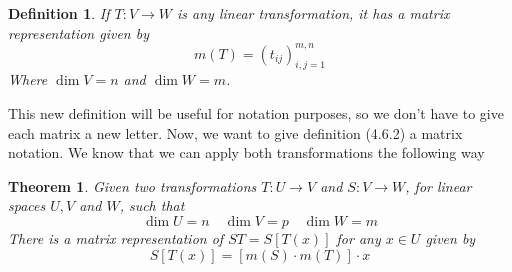 \documentclass{book}
\newtheorem{theorem}{Theorem}[section]
\newtheorem{definition}{Definition}[section]
\begin{document}
\begin{definition}
    If $T: V \to W$ is any linear transformation, it has a matrix representation given by
    \begin{equation}
        m(T) = \left(t_{ij}\right)^{m,n}_{i,j=1}
    \end{equation}
    Where $\dim V = n$ and $\dim W = m$.
\end{definition}
This new definition will be useful for notation purposes, so we don't have to give each matrix a new letter.
Now, we want to give definition (4.6.2) a matrix notation. We know that we can apply both transformations the following way
\begin{theorem}
    Given two transformations $T: U \to V$ and $S: V \to W$, for linear spaces $U,V$ and $W$, such that
    \begin{equation*}
        \dim U = n\quad\dim V = p\quad\dim W = m
    \end{equation*}
    There is a matrix representation of $ST = S\left[T(x)\right]$ for any $x\in U$ given by
    \begin{equation*}
        S\left[T(x)\right] = \left[m(S)\cdot m(T)\right]\cdot x
    \end{equation*}
\end{theorem}
\end{document}
